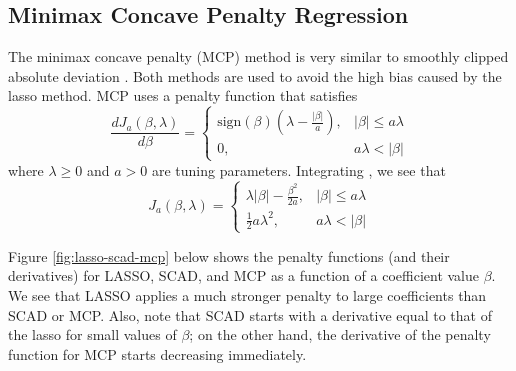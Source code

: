 \documentclass{article}
\newcommand{\sign}{\text{sign}}
\begin{document}
\subsection{Minimax Concave Penalty Regression}
The minimax concave penalty (MCP) method is very similar to smoothly clipped absolute deviation \cite{zhang2010nearly, breheny2016lasso}. Both methods are used to avoid the high bias caused by the lasso method. MCP uses a penalty function that satisfies
\begin{equation}
	\frac{dJ_a(\beta, \lambda)}{d\beta} = \left\{\begin{array}{ll}
		\sign(\beta)\left(\lambda - \frac{\vert \beta \vert}{a}\right),& \vert \beta \vert \leq a\lambda\\
		0,&a\lambda < \vert \beta \vert
	\end{array}\right.
\end{equation}
where $\lambda\geq 0$ and $a> 0$ are tuning parameters. Integrating \cite{breheny2016lasso}, we see that
\begin{equation}
	J_a(\beta, \lambda) = \left\{\begin{array}{ll}
		\lambda \vert \beta \vert - \frac{\beta^2}{2a},&\vert \beta \vert \leq a\lambda\\
		\frac{1}{2}a\lambda^2,&a\lambda < \vert \beta \vert
	\end{array}\right.
\end{equation}

Figure \ref{fig:lasso-scad-mcp} below shows the penalty functions (and their derivatives) for LASSO, SCAD, and MCP as a function of a coefficient value $\beta$. We see that LASSO applies a much stronger penalty to large coefficients than SCAD or MCP. Also, note that SCAD starts with a derivative equal to that of the lasso for small values of $\beta$; on the other hand, the derivative of the penalty function for MCP starts decreasing immediately.
\end{document}
